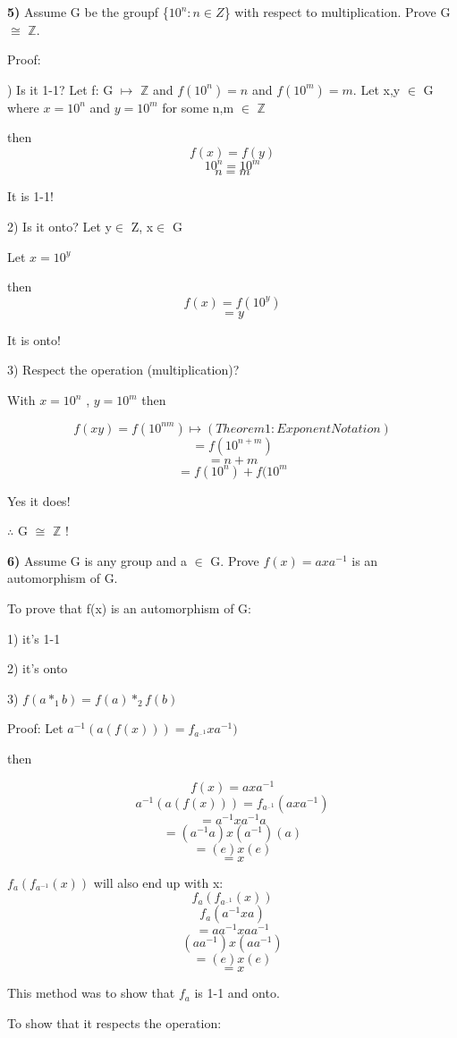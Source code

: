 \documentclass{article}
\begin{document}
\newpage
\textbf{5)}  Assume G be the groupf \{$10^{n} : n\in Z$\} with respect to multiplication.
Prove  G$\cong$ $\mathbb{Z}$.

\medskip
Proof:

) Is it 1-1? Let f: G $\mapsto$ $\mathbb{Z}$ and  $f(10^{n})=n$ and  $f(10^{m})=m$. Let x,y $\in$ G where $x=10^{n}$ and $y=10^{m}$ for some n,m $\in$ $\mathbb{Z}$


then
$$f(x)=f(y)$$
$$10^{n}=10^{m}$$
$$n=m$$

It is 1-1!
\medskip

2) Is it onto? Let y$\in$ Z, x$\in$ G

Let $x=10^{y}$

then $$f(x)=f(10^{y})$$
$$=y$$

It is onto!
\medskip

3) Respect the operation (multiplication)?
\medskip


With $x=10^{n}$ , $y=10^{m}$
\medskip
then 

$$f(xy)=f(10^{nm})   \mapsto (Theorem  1: Exponent Notation) $$
$$=f(10^{n+m})$$
$$=n+m$$
$$=f(10^{n})+f(10^{m}$$

Yes it does!
\medskip


$ \therefore$ G $\cong$ $\mathbb{Z}$ ! 


\newpage

\medskip
\textbf{6)} Assume G is any group and a $\in$ G. Prove $f(x)=axa^{-1}$ is an automorphism of G.  

\medskip 

To prove that f(x) is an automorphism of G:


1) it's 1-1


2) it's onto


3) $f(a*_1b)=f(a)*_2f(b)$
\medskip

Proof: 
Let $a^{-1}(a(f(x)))=f_{a^{_-1}}xa^{-1})$
\medskip


then


$$f(x)=axa^{-1}$$
$$a^{-1}(a(f(x)))=f_{a^{_-1}}(axa^{-1})$$
$$=a^{-1}xa^{-1}a$$
$$=(a^{-1}a)x(a^{-1})(a)$$
$$=(e)x(e)$$
$$=x$$

$f_a(f_{a^{-1}}(x))$ will also end up with x:
$$f_a(f_{a^{_-1}}(x))$$
$$f_a(a^{-1}xa)$$
$$=aa^{-1}xaa^{-1}$$
$$(aa^{-1})x(aa^{-1})$$
$$=(e)x(e)$$
$$=x$$

This method was to show that $f_a$ is 1-1 and onto.

\medskip


To show that it respects the operation:
\end{document}
